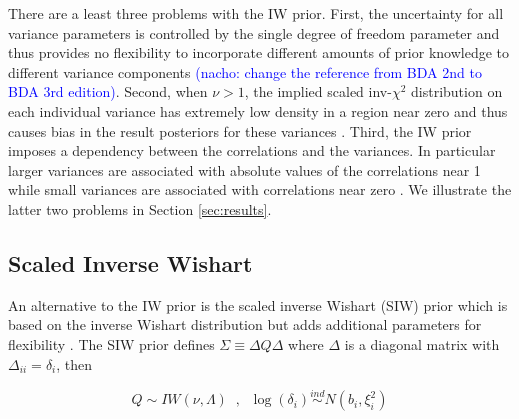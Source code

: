 \documentclass[12pt]{article}
\newcommand{\nacho}[1]{\textcolor{blue}{(nacho: #1)}}
\begin{document}
There are a least three problems with the IW prior. First, the uncertainty for all variance parameters is controlled by the single degree of freedom parameter and thus provides no flexibility to incorporate different amounts of prior knowledge to different variance components \citep{bda2013} \nacho{change the reference from BDA 2nd to BDA 3rd edition}. Second, when $\nu>1$, the implied scaled inv-$\chi^2$ distribution on each individual variance has extremely low density in a region near zero and thus causes bias in the result posteriors for these variances \citep{gelman2006prior}.  Third, the IW prior imposes a dependency between the correlations and the variances. In particular larger variances are associated with absolute values of the correlations near 1 while small variances are associated with correlations near zero \citep{visualize}.  We illustrate the latter two problems in Section \ref{sec:results}.



\subsection{Scaled Inverse Wishart \label{sec:siw}}

An alternative to the IW prior is the scaled inverse Wishart (SIW) prior which is based on the inverse Wishart distribution but adds additional parameters for flexibility \citep{odomain}. The SIW prior defines $\Sigma \equiv \Delta Q \Delta $ where $\Delta$ is a diagonal matrix with $\Delta_{ii}=\delta_i$, then 

\begin{equation}
Q \sim  IW(\nu, \Lambda) \;\;, \;\; \log(\delta_i) \stackrel{ind} \sim N(b_i, \xi_i^2)
\label{eq:siw}
\end{equation} 
\end{document}
